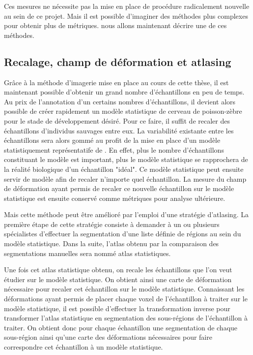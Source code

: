 \documentclass[\main/main.tex]{subfiles}
\begin{document}
%
Ces mesures ne nécessite pas la mise en place de procédure radicalement nouvelle au sein de ce projet.
%
Mais il est possible d'imaginer des méthodes plus complexes pour obtenir plus de métriques.
%
nous allons maintenant décrire une de ces méthodes.

    \subsection{Recalage, champ de déformation et atlasing}
    
Grâce à la méthode d'imagerie mise en place au cours de cette thèse,
il est maintenant possible d'obtenir un grand nombre d'échantillons en peu de temps.
%
Au prix de l'annotation d'un certains nombres d'échantillons, il devient alors possible de créer rapidement un modèle statistique de cerveau de poisson-zèbre pour le stade de développement désiré.
%
Pour ce faire, il suffit de recaler des échantillons d'individus sauvages entre eux.
%
La variabilité existante entre les échantillons sera alors gommé au profit de la mise en place d'un modèle statistiquement représentatife de \pz.
%
En effet, plus le nombre d'échantillons constituant le modèle est important, plus le modèle statistique se rapprochera de la réalité biologique d'un échantillon "idéal".
%
Ce modèle statistique peut ensuite servir de modèle afin de recaler n'importe quel échantillon.
%
La mesure du champ de déformation ayant permis de recaler ce nouvelle échantillon sur le modèle statistique est ensuite conservé comme métriques pour analyse ultérieure.

%
Mais cette méthode peut être amélioré par l'emploi d'une stratégie d'atlasing.
%
La première étape de cette stratégie consiste à demander à un ou plusieurs spécialistes d'effectuer la segmentation d'une liste définie de régions au sein du modèle statistique.
%
Dans la suite, l'atlas obtenu par la comparaison des segmentations manuelles sera nommé atlas statistiques.

Une fois cet atlas statistique obtenu, on recale les échantillons que l'on veut étudier sur le modèle statistique.
%
On obtient ainsi une carte de déformation nécessaire pour recaler cet échantillon sur le modèle statistique.
%
Connaissant les déformations ayant permis de placer chaque voxel de l'échantillon à traiter sur le modèle statistique,
il est possible d'effectuer la transformation inverse pour transformer l'atlas statistique en segmentation des sous-régions de l'échantillon à traiter.
%
On obtient donc pour chaque échantillon une segmentation de chaque sous-région ainsi qu'une carte des déformations nécessaires pour faire correspondre cet échantillon à un modèle statistique.
\end{document}
